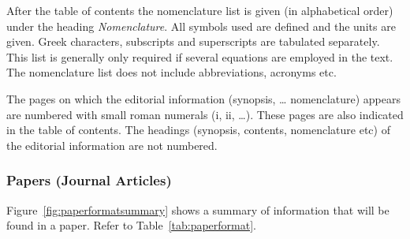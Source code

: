 \documentclass[a5paper, 10pt]{article}
\newcommand{\subsectionname}[1]{\emph{#1}}
\begin{document}
After the table of contents the nomenclature list is given (in
alphabetical order) under the heading \subsectionname{Nomenclature}.  All
symbols used are defined and the units are given.  Greek
characters, subscripts and superscripts are tabulated separately.
This list is generally only required if several equations are employed
in the text.  The nomenclature list does not include abbreviations,
acronyms etc.

The pages on which the editorial information (synopsis, \dots
nomenclature) appears are numbered with small roman numerals (i, ii,
\dots).  These pages are also indicated in the table of contents.  The
headings (synopsis, contents, nomenclature etc) of the editorial
information are not numbered.

\subsubsection{Papers (Journal Articles)}
Figure~\ref{fig:paperformatsummary} shows a summary of information
that will be found in a paper.  Refer to Table~\ref{tab:paperformat}.
\end{document}
